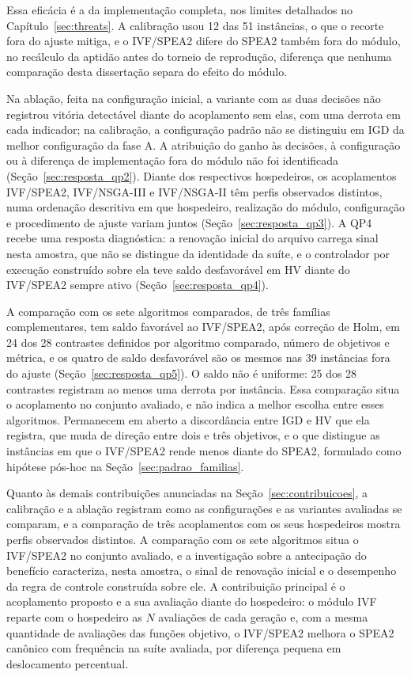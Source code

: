 Essa eficácia é a da implementação completa, nos limites detalhados no Capítulo~\ref{sec:threats}. A calibração usou 12 das 51 instâncias, o que o recorte fora do ajuste mitiga, e o IVF/SPEA2 difere do SPEA2 também fora do módulo, no recálculo da aptidão antes do torneio de reprodução, diferença que nenhuma comparação desta dissertação separa do efeito do módulo.

Na ablação, feita na configuração inicial, a variante com as duas decisões não registrou vitória detectável diante do acoplamento sem elas, com uma derrota em cada indicador; na calibração, a configuração padrão não se distinguiu em IGD da melhor configuração da fase A. A atribuição do ganho às decisões, à configuração ou à diferença de implementação fora do módulo não foi identificada (Seção~\ref{sec:resposta_qp2}). Diante dos respectivos hospedeiros, os acoplamentos IVF/SPEA2, IVF/NSGA-III e IVF/NSGA-II têm perfis observados distintos, numa ordenação descritiva em que hospedeiro, realização do módulo, configuração e procedimento de ajuste variam juntos (Seção~\ref{sec:resposta_qp3}). A QP4 recebe uma resposta diagnóstica: a renovação inicial do arquivo carrega sinal nesta amostra, que não se distingue da identidade da suíte, e o controlador por execução construído sobre ela teve saldo desfavorável em HV diante do IVF/SPEA2 sempre ativo (Seção~\ref{sec:resposta_qp4}).

A comparação com os sete algoritmos comparados, de três famílias complementares, tem saldo favorável ao IVF/SPEA2, após correção de Holm, em 24 dos 28 contrastes definidos por algoritmo comparado, número de objetivos e métrica, e os quatro de saldo desfavorável são os mesmos nas 39 instâncias fora do ajuste (Seção~\ref{sec:resposta_qp5}). O saldo não é uniforme: 25 dos 28 contrastes registram ao menos uma derrota por instância. Essa comparação situa o acoplamento no conjunto avaliado, e não indica a melhor escolha entre esses algoritmos. Permanecem em aberto a discordância entre IGD e HV que ela registra, que muda de direção entre dois e três objetivos, e o que distingue as instâncias em que o IVF/SPEA2 rende menos diante do SPEA2, formulado como hipótese pós-hoc na Seção~\ref{sec:padrao_familias}.

Quanto às demais contribuições anunciadas na Seção~\ref{sec:contribuicoes}, a calibração e a ablação registram como as configurações e as variantes avaliadas se comparam, e a comparação de três acoplamentos com os seus hospedeiros mostra perfis observados distintos. A comparação com os sete algoritmos situa o IVF/SPEA2 no conjunto avaliado, e a investigação sobre a antecipação do benefício caracteriza, nesta amostra, o sinal de renovação inicial e o desempenho da regra de controle construída sobre ele. A contribuição principal é o acoplamento proposto e a sua avaliação diante do hospedeiro: o módulo IVF reparte com o hospedeiro as $N$ avaliações de cada geração e, com a mesma quantidade de avaliações das funções objetivo, o IVF/SPEA2 melhora o SPEA2 canônico com frequência na suíte avaliada, por diferença pequena em deslocamento percentual.

